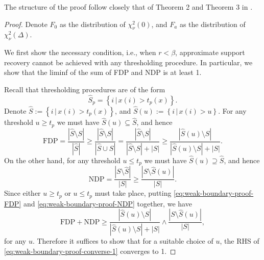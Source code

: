 The structure of the proof follow closely that of Theorem 2 and Theorem 3 in \citet{arias2017distribution}.

\begin{proof}
Denote $F_0$ as the distribution of $\chi^2_\nu(0)$, and $F_a$ as the distribution of $\chi^2_\nu(\Delta)$.

We first show the necessary condition, i.e., when $r<\beta$, approximate support recovery cannot be achieved with any thresholding procedure.
In particular, we show that the liminf of the sum of FDP and NDP is at least 1.

Recall that thresholding procedures are of the form
$$
\widehat{S}_p = \left\{i\,|\,x(i) > t_p(x)\right\}.
$$
Denote $\widehat{S} := \left\{i\,|\,x(i) > t_p(x)\right\}$, and $\widehat{S}(u) := \left\{i\,|\,x(i) > u\right\}$.
For any threshold $u\ge t_p$ we must have $\widehat{S}(u)\subseteq\widehat{S}$, and hence
\begin{equation} \label{eq:weak-boundary-proof-FDP}
    \text{FDP} = \frac{|\widehat{S}\setminus{S}|}{|\widehat{S}|} \ge \frac{|\widehat{S}\setminus{S}|}{|\widehat{S}\cup{S}|} = \frac{|\widehat{S}\setminus{S}|}{|\widehat{S}\setminus{S}| + |S|} \ge
    \frac{|\widehat{S}(u)\setminus{S}|}{|\widehat{S}(u)\setminus{S}| + |S|}.
\end{equation}
On the other hand, for any threshold $u\le t_p$ we must have $\widehat{S}(u)\supseteq\widehat{S}$, and hence
\begin{equation} \label{eq:weak-boundary-proof-NDP}
    \text{NDP} = \frac{|{S}\setminus\widehat{S}|}{|{S}|} \ge 
    \frac{|{S}\setminus\widehat{S}(u)|}{|{S}|}.
\end{equation}
Since either $u\ge t_p$ or  $u\le t_p$ must take place, putting \eqref{eq:weak-boundary-proof-FDP} and \eqref{eq:weak-boundary-proof-NDP} together, we have
\begin{equation} \label{eq:weak-boundary-proof-converse-1}
    \text{FDP} + \text{NDP} 
    \ge \frac{|\widehat{S}(u)\setminus{S}|}{|\widehat{S}(u)\setminus{S}|+|{S}|} \wedge \frac{|{S}\setminus\widehat{S}(u)|}{|{S}|},
\end{equation}
for any $u$.
Therefore it suffices to show that for a suitable choice of $u$, the RHS of \eqref{eq:weak-boundary-proof-converse-1} converges to 1.


\end{proof}
